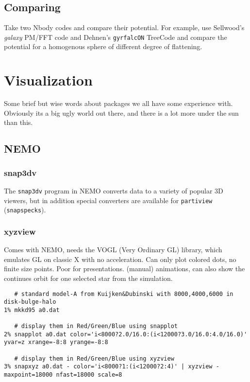 \section{Comparing}

Take two Nbody codes and compare their potential. For example, use Sellwood's 
{\it galaxy} PM/FFT code and Dehnen's {\tt gyrfalcON} TreeCode and compare the
potential for a homogenous sphere of different degree of flattening.


\chapter                {Visualization}

Some brief but wise words about packages we all have some experience with.
Obviously its a big ugly world out there, and there is a lot more under the
sun than this.

\section{NEMO}


\subsection{snap3dv}

The {\tt snap3dv} program in NEMO converts data to a variety of popular
3D viewers, but in addition special converters are available 
for {\tt partiview} ({\tt snapspecks}).

\subsection{xyzview}

Comes with NEMO, needs the VOGL (Very Ordinary GL) library, which emulates
GL on classic X with no acceleration. Can only plot colored dots, no finite
size points. Poor for presentations. (manual) animations, can also show
the continues orbit for one selected star from the simulation. 


\footnotesize\begin{verbatim}
   # standard model-A from Kuijken&Dubinski with 8000,4000,6000 in disk-bulge-halo
1% mkkd95 a0.dat

   # display them in Red/Green/Blue using snapplot 
2% snapplot a0.dat color='i<8000?2.0/16.0:(i<12000?3.0/16.0:4.0/16.0)' yvar=z xrange=-8:8 yrange=-8:8

   # display them in Red/Green/Blue using xyzview
3% snapxyz a0.dat - color='i<8000?1:(i<12000?2:4)' | xyzview - maxpoint=18000 nfast=18000 scale=8
\end{verbatim}\normalsize


